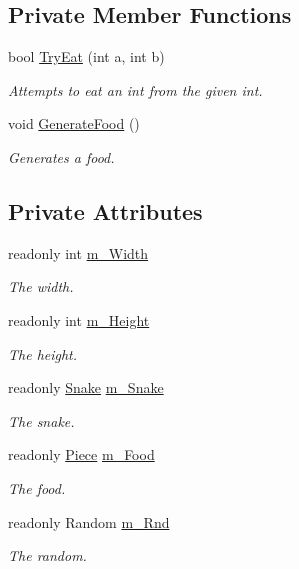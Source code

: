\subsection*{Private Member Functions}
\begin{DoxyCompactItemize}
\item 
bool \mbox{\hyperlink{class_snake_1_1_game_a5efcd7d64d49bc7f068f2eaae008d085}{Try\+Eat}} (int a, int b)
\begin{DoxyCompactList}\small\item\em Attempts to eat an int from the given int. \end{DoxyCompactList}\item 
void \mbox{\hyperlink{class_snake_1_1_game_ad398a631e2e19d4782c0904ed1af1052}{Generate\+Food}} ()
\begin{DoxyCompactList}\small\item\em Generates a food. \end{DoxyCompactList}\end{DoxyCompactItemize}
\subsection*{Private Attributes}
\begin{DoxyCompactItemize}
\item 
readonly int \mbox{\hyperlink{class_snake_1_1_game_a888cadd0a012125452ebb79eaf0ba452}{m\+\_\+\+Width}}
\begin{DoxyCompactList}\small\item\em The width. \end{DoxyCompactList}\item 
readonly int \mbox{\hyperlink{class_snake_1_1_game_add3581587df75e2220076be1829b7bfc}{m\+\_\+\+Height}}
\begin{DoxyCompactList}\small\item\em The height. \end{DoxyCompactList}\item 
readonly \mbox{\hyperlink{class_snake_1_1_snake}{Snake}} \mbox{\hyperlink{class_snake_1_1_game_a6dc056d37537ad9e0d1ca49052a33662}{m\+\_\+\+Snake}}
\begin{DoxyCompactList}\small\item\em The snake. \end{DoxyCompactList}\item 
readonly \mbox{\hyperlink{class_snake_1_1_piece}{Piece}} \mbox{\hyperlink{class_snake_1_1_game_a12e14cdbb5ccab077cb96099b98eed79}{m\+\_\+\+Food}}
\begin{DoxyCompactList}\small\item\em The food. \end{DoxyCompactList}\item 
readonly Random \mbox{\hyperlink{class_snake_1_1_game_abf97cdaf48baf9d166f116bdba77f962}{m\+\_\+\+Rnd}}
\begin{DoxyCompactList}\small\item\em The random. \end{DoxyCompactList}\end{DoxyCompactItemize}


